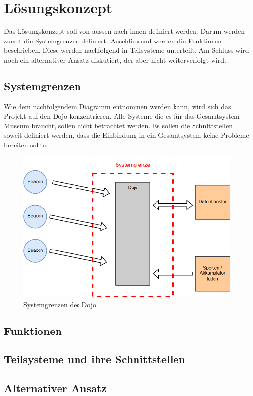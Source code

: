\section{Lösungskonzept}
Das Lösungskonzept soll von aussen nach innen definiert werden. Darum werden zuerst die Systemgrenzen definiert. Anschliessend werden die Funktionen beschrieben. Diese werden nachfolgend in Teilsysteme unterteilt. Am Schluss wird noch ein alternativer Ansatz diskutiert, der aber nicht weiterverfolgt wird.

\subsection{Systemgrenzen}
Wie dem nachfolgendem Diagramm entnommen werden kann, wird sich das Projekt auf den Dojo konzentrieren. Alle Systeme die es für das Gesamtsystem Museum braucht, sollen nicht betrachtet werden. Es sollen die Schnittstellen soweit definiert werden, dass die Einbindung in ein Gesamtsystem keine Probleme bereiten sollte.

\begin{figure}[H]
\begin{center}
	\includegraphics[width=160mm]{data/Loesungskonzept_Systemgrenzen.png}
	\caption{Systemgrenzen des Dojo} %
	\label{fig:first_layer}
\end{center}
\end{figure}

\subsection{Funktionen}
\subsection{Teilsysteme und ihre Schnittstellen}
\subsection{Alternativer Ansatz}


